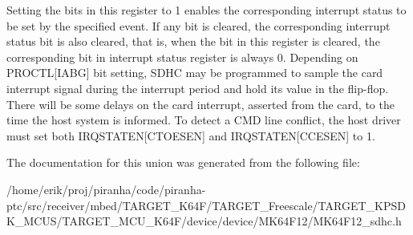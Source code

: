 Setting the bits in this register to 1 enables the corresponding interrupt status to be set by the specified event. If any bit is cleared, the corresponding interrupt status bit is also cleared, that is, when the bit in this register is cleared, the corresponding bit in interrupt status register is always 0. Depending on P\+R\+O\+C\+TL\mbox{[}I\+A\+BG\mbox{]} bit setting, S\+D\+HC may be programmed to sample the card interrupt signal during the interrupt period and hold its value in the flip-\/flop. There will be some delays on the card interrupt, asserted from the card, to the time the host system is informed. To detect a C\+MD line conflict, the host driver must set both I\+R\+Q\+S\+T\+A\+T\+EN\mbox{[}C\+T\+O\+E\+S\+EN\mbox{]} and I\+R\+Q\+S\+T\+A\+T\+EN\mbox{[}C\+C\+E\+S\+EN\mbox{]} to 1. 

The documentation for this union was generated from the following file\+:\begin{DoxyCompactItemize}
\item 
/home/erik/proj/piranha/code/piranha-\/ptc/src/receiver/mbed/\+T\+A\+R\+G\+E\+T\+\_\+\+K64\+F/\+T\+A\+R\+G\+E\+T\+\_\+\+Freescale/\+T\+A\+R\+G\+E\+T\+\_\+\+K\+P\+S\+D\+K\+\_\+\+M\+C\+U\+S/\+T\+A\+R\+G\+E\+T\+\_\+\+M\+C\+U\+\_\+\+K64\+F/device/device/\+M\+K64\+F12/M\+K64\+F12\+\_\+sdhc.\+h\end{DoxyCompactItemize}
